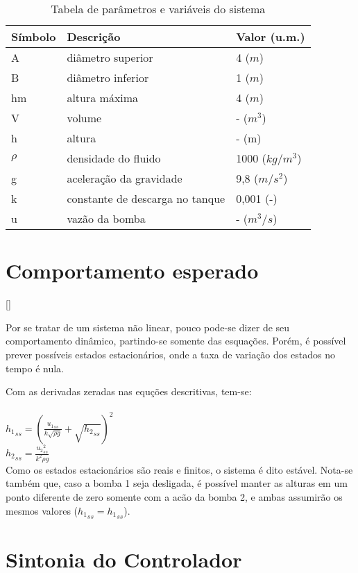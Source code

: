 \begin{table}[H]
	\centering
	\begin{tabular} {|m{5em}|m{15em}|m{8em}|}
		\hline
		Símbolo & Descrição & Valor (u.m.) \\
		\hline
		A & diâmetro superior & 4 ($m$) \\
		B & diâmetro inferior & 1 ($m$) \\
		hm & altura máxima & 4 ($m$) \\
		V & volume & - ($m^3$) \\
		h & altura & - (m) \\
		$\rho$ & densidade do fluido & 1000 ($kg/m^3$) \\
		g & aceleração da gravidade & 9,8 ($m/s^2$) \\
		k & constante de descarga no tanque & 0,001 (-)\\
		u & vazão da bomba & - ($m^3/s$)\\
		\hline
	\end{tabular}
	\caption{Tabela de parâmetros e variáveis do sistema}
	\label{tbl_parameters}
\end{table}

\section{Comportamento esperado}[\label{comportamento_esperado}]

Por se tratar de um sistema não linear, pouco pode-se dizer de seu comportamento dinâmico, partindo-se somente das esquações. Porém, é possível prever possíveis estados estacionários, onde a taxa de variação dos estados no tempo é nula.

Com as derivadas zeradas nas equções descritivas, tem-se:
\\\\
$
{h_1}_{ss} = (\frac{{u_1}_{ss}}{k\sqrt{\rho g}} + \sqrt{{h_2}_{ss}})^2
$
\\
$
{h_2}_{ss} = \frac{{u_2}_{ss}^2}{k^2 \rho g}
$
\\
Como os estados estacionários são reais e finitos, o sistema é dito estável. Nota-se também que, caso a bomba 1 seja desligada, é possível manter as alturas em um ponto diferente de zero somente com a acão da bomba 2, e ambas assumirão os mesmos valores (${h_1}_{ss} = {h_1}_{ss}$).

\section{Sintonia do Controlador}

